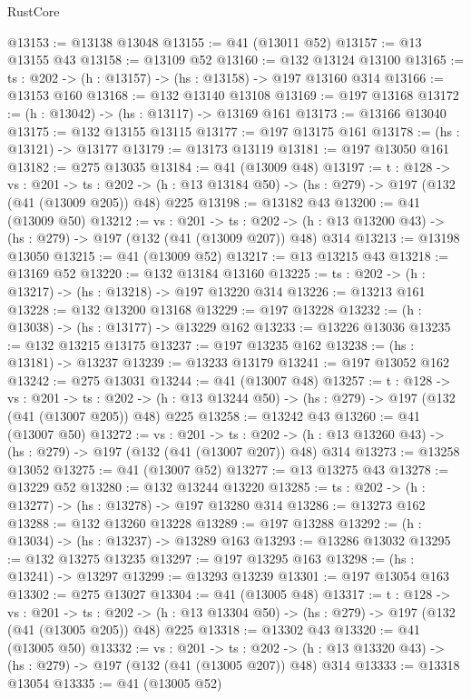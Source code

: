 \begin{lexlean}{RustCore}
\begin{coremodule}
@13153 := @13138 @13048
@13155 := @41 (@13011 @52)
@13157 := @13 @13155 @43
@13158 := @13109 @52
@13160 := @132 @13124 @13100
@13165 := {ts : @202} -> (h : @13157) -> (hs : @13158) -> @197 @13160 @314
@13166 := @13153 @160
@13168 := @132 @13140 @13108
@13169 := @197 @13168
@13172 := (h : @13042) -> (hs : @13117) -> @13169 @161
@13173 := @13166 @13040
@13175 := @132 @13155 @13115
@13177 := @197 @13175 @161
@13178 := (hs : @13121) -> @13177
@13179 := @13173 @13119
@13181 := @197 @13050 @161
@13182 := @275 @13035
@13184 := @41 (@13009 @48)
@13197 := {t : @128} ->
  {vs : @201} ->
  {ts : @202} -> (h : @13 @13184 @50) -> (hs : @279) -> @197 (@132 (@41 (@13009 @205)) @48) @225
@13198 := @13182 @43
@13200 := @41 (@13009 @50)
@13212 := {vs : @201} ->
  {ts : @202} -> (h : @13 @13200 @43) -> (hs : @279) -> @197 (@132 (@41 (@13009 @207)) @48) @314
@13213 := @13198 @13050
@13215 := @41 (@13009 @52)
@13217 := @13 @13215 @43
@13218 := @13169 @52
@13220 := @132 @13184 @13160
@13225 := {ts : @202} -> (h : @13217) -> (hs : @13218) -> @197 @13220 @314
@13226 := @13213 @161
@13228 := @132 @13200 @13168
@13229 := @197 @13228
@13232 := (h : @13038) -> (hs : @13177) -> @13229 @162
@13233 := @13226 @13036
@13235 := @132 @13215 @13175
@13237 := @197 @13235 @162
@13238 := (hs : @13181) -> @13237
@13239 := @13233 @13179
@13241 := @197 @13052 @162
@13242 := @275 @13031
@13244 := @41 (@13007 @48)
@13257 := {t : @128} ->
  {vs : @201} ->
  {ts : @202} -> (h : @13 @13244 @50) -> (hs : @279) -> @197 (@132 (@41 (@13007 @205)) @48) @225
@13258 := @13242 @43
@13260 := @41 (@13007 @50)
@13272 := {vs : @201} ->
  {ts : @202} -> (h : @13 @13260 @43) -> (hs : @279) -> @197 (@132 (@41 (@13007 @207)) @48) @314
@13273 := @13258 @13052
@13275 := @41 (@13007 @52)
@13277 := @13 @13275 @43
@13278 := @13229 @52
@13280 := @132 @13244 @13220
@13285 := {ts : @202} -> (h : @13277) -> (hs : @13278) -> @197 @13280 @314
@13286 := @13273 @162
@13288 := @132 @13260 @13228
@13289 := @197 @13288
@13292 := (h : @13034) -> (hs : @13237) -> @13289 @163
@13293 := @13286 @13032
@13295 := @132 @13275 @13235
@13297 := @197 @13295 @163
@13298 := (hs : @13241) -> @13297
@13299 := @13293 @13239
@13301 := @197 @13054 @163
@13302 := @275 @13027
@13304 := @41 (@13005 @48)
@13317 := {t : @128} ->
  {vs : @201} ->
  {ts : @202} -> (h : @13 @13304 @50) -> (hs : @279) -> @197 (@132 (@41 (@13005 @205)) @48) @225
@13318 := @13302 @43
@13320 := @41 (@13005 @50)
@13332 := {vs : @201} ->
  {ts : @202} -> (h : @13 @13320 @43) -> (hs : @279) -> @197 (@132 (@41 (@13005 @207)) @48) @314
@13333 := @13318 @13054
@13335 := @41 (@13005 @52)

\end{coremodule}
\end{lexlean}
